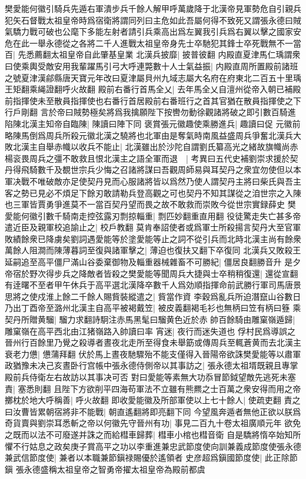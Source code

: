 樊愛能何徽引騎兵先遁右軍潰步兵千餘人解甲呼萬歲降于北漢帝見軍勢危自引親兵犯矢石督戰太祖皇帝時爲宿衛將謂同列曰主危如此吾屬何得不致死又謂張永德曰賊氣驕力戰可破也公麾下多能左射者請引兵乘高出爲左翼我引兵爲右翼以擊之國家安危在此一舉永德從之各將二千人進戰太祖皇帝身先士卒馳犯其鋒士卒死戰無不一當百|{
	先悉薦翻太祖皇帝自此肇基皇業}
北漢兵披靡|{
	披普彼翻}
内殿直夏津馬仁瑀謂衆曰使乘輿受敵安用我輩躍馬引弓大呼連斃數十人士氣益振|{
	内殿直周所置殿前諸班之號夏津漢鄃縣唐天寶元年改曰夏津屬貝州九域志屬大名府在府東北二百五十里瑀王矩翻乘䋲證翻呼火故翻}
殿前右番行首馬全乂|{
	去年馬全乂自澶州從帝入朝已補殿前指揮使未至散員指揮使也右番行首居殿前右番班行之首其官猶在散員指揮使之下行戶剛翻}
言於帝曰賊勢極矣將爲我擒願陛下按轡勿動徐觀諸將破之即引數百騎進陷陳北漢主知帝自臨陳|{
	陳讀曰陣下同}
褒賞張元徽趣使乘勝進兵|{
	趣讀曰促}
元徽前略陳馬倒爲周兵所殺元徽北漢之驍將也北軍由是奪氣時南風益盛周兵爭奮北漢兵大敗北漢主自舉赤幟以收兵不能止|{
	北漢雖出於沙陀自謂劉氏纂高光之緒故旗幟尚赤}
楊衮畏周兵之彊不敢救且恨北漢主之語全軍而退　|{
	考異曰五代史補劉崇求援於契丹得飛騎數千及覩世宗兵少悔之召諸將謀曰吾觀周師易與耳契丹之衆宜勿使但以本軍决戰不唯破敵亦足使契丹見而心服諸將皆以爲然乃使人謂契丹主將曰柴氏與吾主客之勢已見必不煩足下餘刃敢請勒兵登高觀之可也契丹不知其謀從之洎世宗之入陳也三軍皆賈勇爭進莫不一當百契丹望而畏之故不敢救而崇敗今從世宗實録薛史}
樊愛能何徽引數千騎南走控弦露刃剽掠輜重|{
	剽匹妙翻重直用翻}
役徒驚走失亡甚多帝遣近臣及親軍校追諭止之|{
	校戶教翻}
莫肯奉詔使者或爲軍士所殺揚言契丹大至官軍敗績餘衆已降虜矣劉詞遇愛能等於塗愛能等止之詞不從引兵而北時北漢主尚有餘衆萬餘人阻澗而陳薄暮詞至復與諸軍擊之|{
	薄迫也復扶又翻下卒復同}
北漢兵又敗殺王延嗣追至高平僵尸滿山谷委棄御物及輜重器械雜畜不可勝紀|{
	僵居良翻勝音升}
是夕帝宿於野次得步兵之降敵者皆殺之樊愛能等聞周兵大捷與士卒稍稍復還|{
	還從宣翻}
有逹曙不至者甲午休兵于高平選北漢降卒數千人爲効順指揮命前武勝行軍司馬唐景思將之使戍淮上餘二千餘人賜貲裝縱遣之|{
	貲當作資}
李穀爲亂兵所迫潛竄山谷數日乃出丁酉帝至潞州北漢主自高平被褐戴笠|{
	被皮義翻褐毛衫也無柄曰笠有柄曰簦}
乘契丹所贈黄騮|{
	騮力求翻詩駉注赤馬黑髦曰騮黄色近於赤}
帥百餘騎由雕窠嶺遁歸|{
	雕窠嶺在高平西北由江猪嶺路入帥讀曰率}
宵迷|{
	夜行而迷失道也}
俘村民爲導誤之晉州行百餘里乃覺之殺導者晝夜北走所至得食未舉筯或傳周兵至輒蒼黄而去北漢主衰老力憊|{
	憊蒲拜翻}
伏於馬上晝夜馳驟殆不能支僅得入晉陽帝欲誅樊愛能等以肅軍政猶豫未决己亥晝卧行宫帳中張永德侍側帝以其事訪之|{
	張永德太祖壻既親且專掌殿前兵侍衛左右故訪以其事决可否}
對曰愛能等素無大功忝冒節鉞望敵先逃死未塞責|{
	塞悉則翻}
且陛下方欲削平四海苟軍法不立雖有熊羆之士百萬之衆安得而用之帝擲枕於地大呼稱善|{
	呼火故翻}
即收愛能徽及所部軍使以上七十餘人|{
	使疏吏翻}
責之曰汝曹皆累朝宿將非不能戰|{
	朝直遙翻將即亮翻下同}
今望風奔遁者無他正欲以朕爲奇貨賣與劉崇耳悉斬之帝以何徽先守晉州有功|{
	事見二百九十卷太祖廣順元年}
欲免之既而以法不可廢遂并誅之而給槥車歸葬|{
	槥車小棺也槥音衛}
自是驕將惰卒始知所懼不行姑息之政矣庚子賞高平之功以李重進兼忠武節度使向訓兼義成節度使張永德兼武信節度使|{
	兼者以本職兼節鎭禄賜優於遙領者}
史彦超爲鎭國節度使|{
	此正除節鎭}
張永德盛稱太祖皇帝之智勇帝擢太祖皇帝為殿前都虞

